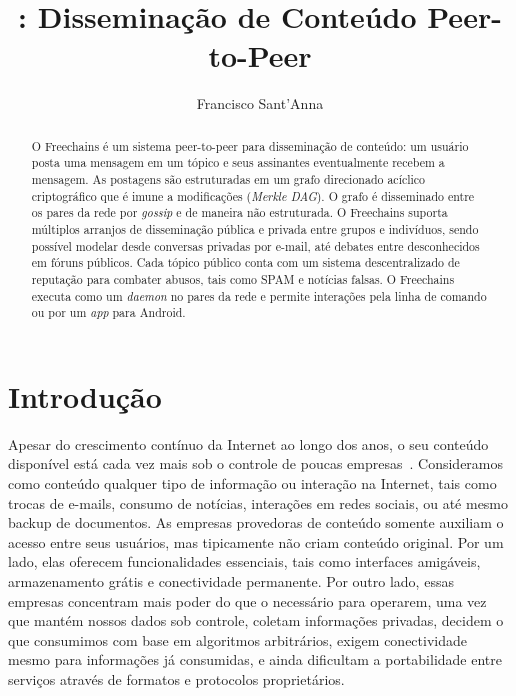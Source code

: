 \documentclass[12pt]{article}
\title{\FC: Disseminação de Conteúdo Peer-to-Peer}
\author{Francisco Sant'Anna\inst{1}}
\newcommand{\FC} {Freechains\xspace}
\begin{document}
 

\maketitle

\begin{abstract}
O \FC é um sistema peer-to-peer para disseminação de conteúdo: um
usuário posta uma mensagem em um tópico e seus assinantes eventualmente recebem
a mensagem.
As postagens são estruturadas em um grafo direcionado acíclico criptográfico
que é imune a modificações (\emph{Merkle DAG}).
O grafo é disseminado entre os pares da rede por \emph{gossip} e de maneira não
estruturada.
O \FC suporta múltiplos arranjos de disseminação pública e privada entre grupos
e indivíduos, sendo possível modelar desde conversas privadas por e-mail, até
debates entre desconhecidos em fóruns públicos.
Cada tópico público conta com um sistema descentralizado de reputação para
combater abusos, tais como SPAM e notícias falsas.
O \FC executa como um \emph{daemon} no pares da rede e permite
interações pela linha de comando ou por um \emph{app} para Android.
\end{abstract}
     

\section{Introdução}

Apesar do crescimento contínuo da Internet ao longo dos anos, o seu conteúdo
disponível está cada vez mais sob o controle de poucas
empresas~\cite{internet.fixing}.
Consideramos como conteúdo qualquer tipo de informação ou interação na
Internet, tais como trocas de e-mails, consumo de notícias, interações em redes
sociais, ou até mesmo backup de documentos.
%
As empresas provedoras de conteúdo somente auxiliam o acesso entre seus
usuários, mas tipicamente não criam conteúdo original.
Por um lado, elas oferecem funcionalidades essenciais, tais como interfaces
amigáveis, armazenamento grátis e conectividade permanente.
Por outro lado, essas empresas concentram mais poder do que o necessário para
operarem, uma vez que mantém nossos dados sob controle, coletam informações
privadas, decidem o que consumimos com base em algoritmos arbitrários, exigem
conectividade mesmo para informações já consumidas, e ainda dificultam a
portabilidade entre serviços através de formatos e protocolos proprietários.
\end{document}
